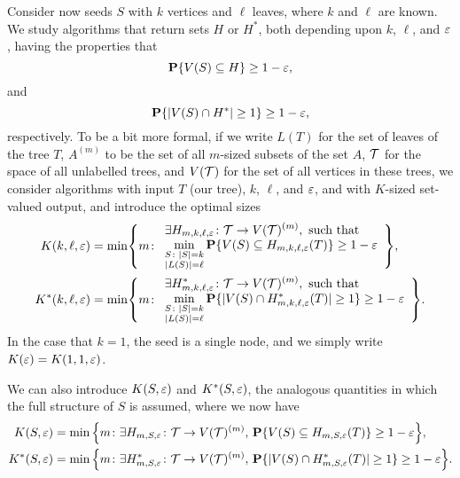 Consider now seeds $S$ with $k$ vertices and $\ell$ leaves, where $k$
and $\ell$ are known. We study algorithms that return sets $H$ or
$H^*$, both depending upon $k$, $\ell$, and $\varepsilon$, having the
properties that
\[
  \operatorname{\mathbf{P}}\{V(S) \subseteq H\} \ge 1 - \varepsilon ,
\]
and
\[
  \operatorname{\mathbf{P}}\{|V(S) \cap H^*| \ge 1\} \ge 1 - \varepsilon ,
\]
respectively. To be a bit more formal, if we write $L(T)$ for the set
of leaves of the tree $T$, $A^{(m)}$ to be the set of all $m$-sized
subsets of the set $A$, $\mathcal{T}$ for the space of all unlabelled trees,
and $V(\mathcal{T})$ for the set of all vertices in these trees, we consider
algorithms with input $T$ (our tree), $k$, $\ell$, and $\varepsilon$, and
with $K$-sized set-valued output, and introduce the optimal sizes
\begin{align*}
  K(k, \ell, \eps) &= \min\left\{
                     m \colon \begin{array}{l} \displaystyle
                                \exists H_{m, k, \ell, \eps} \colon \sT \to V(\sT)^{(m)} , \text{ such that} \\ \displaystyle
                                \min_{\substack{S \colon |S| = k \\ |L(S)| = \ell}} \Pr\{V(S) \subseteq H_{m, k, \ell, \eps}(T)\} \ge 1 - \eps
                              \end{array}
  \right\} , \\
  K^*(k, \ell, \eps) &= \min\left\{
                       m \colon \begin{array}{l} \displaystyle
                                  \exists H^*_{m, k, \ell, \eps} \colon \sT \to V(\sT)^{(m)} , \text{ such that} \\ \displaystyle
                                  \min_{\substack{S \colon |S| = k \\ |L(S)| = \ell}} \Pr\{|V(S) \cap H^*_{m, k, \ell, \eps}(T)| \ge 1\} \ge 1 - \eps 
                                \end{array}
  \right\} . \\
\end{align*}
In the case that $k = 1$, the seed is a single node, and we simply
write $K(\varepsilon) = K(1, 1, \varepsilon)$.

We can also introduce $K(S, \varepsilon)$ and $K^*(S, \varepsilon)$, the analogous
quantities in which the full structure of $S$ is assumed, where we now
have
\begin{align*}
  K(S, \varepsilon) &= \min\Big\{m \colon \exists H_{m, S, \varepsilon} \colon \mathcal{T} \to V(\mathcal{T})^{(m)} ,\, \operatorname{\mathbf{P}}\{V(S) \subseteq H_{m, S, \varepsilon}(T)\} \ge 1 - \varepsilon \Big\} , \\
  K^*(S, \varepsilon) &= \min\Big\{m \colon \exists H^*_{m, S, \varepsilon} \colon \mathcal{T} \to V(\mathcal{T})^{(m)} ,\, \operatorname{\mathbf{P}}\{|V(S) \cap H^*_{m, S, \varepsilon}(T)| \ge 1\} \ge 1 - \varepsilon \Big\} .
\end{align*}

